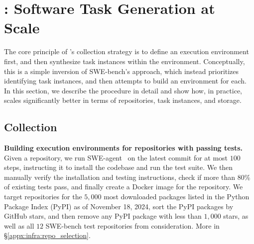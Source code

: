 \section{\bugs{}: Software Task Generation at Scale}
\label{sec:swesmith}
The core principle of \bugs{}'s collection strategy is to define an execution environment first, and then synthesize task instances within the environment.
Conceptually, this is a simple inversion of SWE-bench's approach, which instead prioritizes identifying task instances, and then attempts to build an environment for each.
In this section, we describe the procedure in detail and show how, in practice, \bugs{} scales significantly better in terms of repositories, task instances, and storage.

\subsection{Collection}
\label{sec:swesmith:collection}

\textbf{Building execution environments for repositories with passing tests.}
Given a repository, we run SWE-agent~\citep{yang_swe-agent_2024} on the latest commit for at most $100$ steps, instructing it to install the codebase and run the test suite.
We then manually verify the installation and testing instructions, check if more than $80$\% of existing tests pass, and finally create a Docker image for the repository.
We target repositories for the $5,000$ most downloaded packages listed in the Python Package Index (PyPI) as of November 18, 2024, sort the PyPI packages by GitHub stars, and then remove any PyPI package with less than $1,000$ stars, as well as all $12$ SWE-bench test repositories from consideration.
More in \S\ref{appx:infra:repo_selection}.

